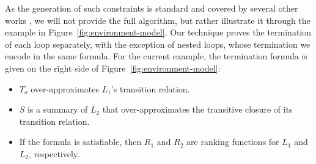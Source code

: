 \documentclass[preprint]{sigplanconf}
\theoremstyle{definition}
\begin{document}

As the generation of such constraints is standard and covered by several other works \cite{DBLP:conf/pldi/GrebenshchikovLPR12,DBLP:conf/pldi/GulwaniSV08}, 
we will not provide the full algorithm, but rather illustrate it through the example in Figure~\ref{fig:environment-model}.
Our technique proves the termination of each loop separately, 
with the exception of nested loops, whose termination we encode in the same formula. For the current example, the termination formula is given on the right side of 
Figure~\ref{fig:environment-model}:
\begin{itemize}
\item $T_o$  over-approximates $L_1$'s transition relation.
\item $S$ is a summary of $L_2$ that over-approximates the transitive closure of its transition relation.
\item If the formula is satisfiable, then $R_1$ and $R_2$ are ranking functions for $L_1$ and $L_2$, respectively.
\end{itemize}


\end{document}
